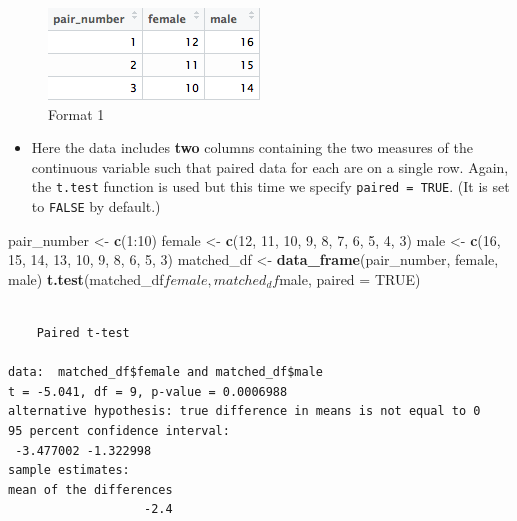 \documentclass[twoside, 12pt]{article}
\newenvironment{Shaded}{\begin{snugshade}}{\end{snugshade}}
\newcommand{\KeywordTok}[1]{\textcolor[rgb]{0.13,0.29,0.53}{\textbf{{#1}}}}
\newcommand{\DataTypeTok}[1]{\textcolor[rgb]{0.13,0.29,0.53}{{#1}}}
\newcommand{\DecValTok}[1]{\textcolor[rgb]{0.00,0.00,0.81}{{#1}}}
\newcommand{\StringTok}[1]{\textcolor[rgb]{0.31,0.60,0.02}{{#1}}}
\newcommand{\OtherTok}[1]{\textcolor[rgb]{0.56,0.35,0.01}{{#1}}}
\newcommand{\NormalTok}[1]{{#1}}
\providecommand{\tightlist}{%
  \setlength{\itemsep}{0pt}\setlength{\parskip}{0pt}}
\begin{document}
\begin{figure}[htbp]
\centering
\includegraphics{figure/format1.png}
\caption{Format 1}
\end{figure}

\begin{itemize}
\tightlist
\item
  Here the data includes \textbf{two} columns containing the two
  measures of the continuous variable such that paired data for each are
  on a single row. Again, the \texttt{t.test} function is used but this
  time we specify \texttt{paired\ =\ TRUE}. (It is set to \texttt{FALSE}
  by default.)
\end{itemize}

\begin{Shaded}
\begin{Highlighting}[]
\NormalTok{pair_number <-}\StringTok{ }\KeywordTok{c}\NormalTok{(}\DecValTok{1}\NormalTok{:}\DecValTok{10}\NormalTok{)}
\NormalTok{female <-}\StringTok{ }\KeywordTok{c}\NormalTok{(}\DecValTok{12}\NormalTok{, }\DecValTok{11}\NormalTok{, }\DecValTok{10}\NormalTok{, }\DecValTok{9}\NormalTok{, }\DecValTok{8}\NormalTok{, }\DecValTok{7}\NormalTok{, }\DecValTok{6}\NormalTok{, }\DecValTok{5}\NormalTok{, }\DecValTok{4}\NormalTok{, }\DecValTok{3}\NormalTok{)}
\NormalTok{male <-}\StringTok{ }\KeywordTok{c}\NormalTok{(}\DecValTok{16}\NormalTok{, }\DecValTok{15}\NormalTok{, }\DecValTok{14}\NormalTok{, }\DecValTok{13}\NormalTok{, }\DecValTok{10}\NormalTok{, }\DecValTok{9}\NormalTok{, }\DecValTok{8}\NormalTok{, }\DecValTok{6}\NormalTok{, }\DecValTok{5}\NormalTok{, }\DecValTok{3}\NormalTok{)}
\NormalTok{matched_df <-}\StringTok{ }\KeywordTok{data_frame}\NormalTok{(pair_number, female, male)}
\KeywordTok{t.test}\NormalTok{(matched_df$female, matched_df$male, }\DataTypeTok{paired =} \OtherTok{TRUE}\NormalTok{)}
\end{Highlighting}
\end{Shaded}

\begin{Verbatim}[frame=single]

    Paired t-test

data:  matched_df$female and matched_df$male
t = -5.041, df = 9, p-value = 0.0006988
alternative hypothesis: true difference in means is not equal to 0
95 percent confidence interval:
 -3.477002 -1.322998
sample estimates:
mean of the differences 
                   -2.4 
\end{Verbatim}
\end{document}
